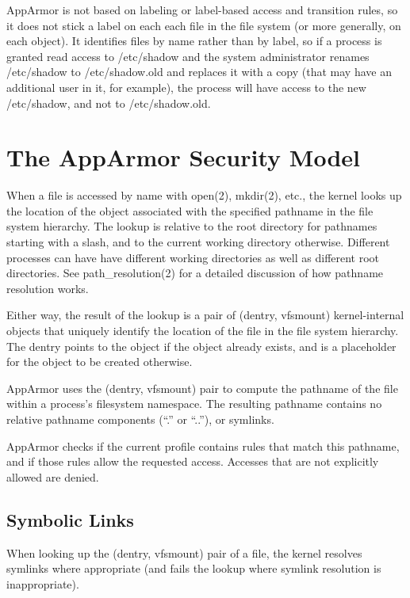 \documentclass[a4paper]{article}
\begin{document}
AppArmor is not based on labeling or label-based access and transition
rules, so it does not stick a label on each each file in the file system
(or more generally, on each object).  It identifies files by name rather
than by label, so if a process is granted read access to /etc/shadow and
the system administrator renames /etc/shadow to /etc/shadow.old and
replaces it with a copy (that may have an additional user in it, for
example), the process will have access to the new /etc/shadow, and not
to /etc/shadow.old.


\section{The AppArmor Security Model}
\label{sec:model}

When a file is accessed by name with open(2), mkdir(2), etc., the kernel
looks up the location of the object associated with the specified
pathname in the file system hierarchy. The lookup is relative to the
root directory for pathnames starting with a slash, and to the current
working directory otherwise. Different processes can have have different
working directories as well as different root directories. See
path\_resolution(2) for a detailed discussion of how pathname resolution
works.

Either way, the result of the lookup is a pair of (dentry, vfsmount)
kernel-internal objects that uniquely identify the location of the file
in the file system hierarchy. The dentry points to the object if the
object already exists, and is a placeholder for the object to be created
otherwise.

AppArmor uses the (dentry, vfsmount) pair to compute the pathname of the
file within a process's filesystem namespace. The resulting pathname
contains no relative pathname components (``.'' or ``..''), or symlinks.

AppArmor checks if the current profile contains rules that match this
pathname, and if those rules allow the requested access.  Accesses
that are not explicitly allowed are denied.


\subsection{Symbolic Links}

When looking up the (dentry, vfsmount) pair of a file, the kernel
resolves symlinks where appropriate (and fails the lookup where symlink
resolution is inappropriate).
\end{document}
